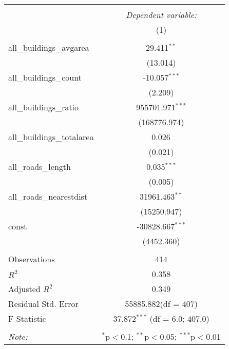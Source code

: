 \begin{table}[!htbp] \centering
\begin{tabular}{@{\extracolsep{5pt}}lc}
\\[-1.8ex]\hline
\hline \\[-1.8ex]
& \multicolumn{1}{c}{\textit{Dependent variable:}} \
\cr \cline{1-2}
\\[-1.8ex] & (1) \\
\hline \\[-1.8ex]
 all_buildings_avgarea & 29.411$^{**}$ \\
  & (13.014) \\
 all_buildings_count & -10.057$^{***}$ \\
  & (2.209) \\
 all_buildings_ratio & 955701.971$^{***}$ \\
  & (168776.974) \\
 all_buildings_totalarea & 0.026$^{}$ \\
  & (0.021) \\
 all_roads_length & 0.035$^{***}$ \\
  & (0.005) \\
 all_roads_nearestdist & 31961.463$^{**}$ \\
  & (15250.947) \\
 const & -30828.667$^{***}$ \\
  & (4452.360) \\
\hline \\[-1.8ex]
 Observations & 414 \\
 $R^2$ & 0.358 \\
 Adjusted $R^2$ & 0.349 \\
 Residual Std. Error & 55885.882(df = 407)  \\
 F Statistic & 37.872$^{***}$ (df = 6.0; 407.0) \\
\hline
\hline \\[-1.8ex]
\textit{Note:} & \multicolumn{1}{r}{$^{*}$p$<$0.1; $^{**}$p$<$0.05; $^{***}$p$<$0.01} \\
\end{tabular}
\end{table}